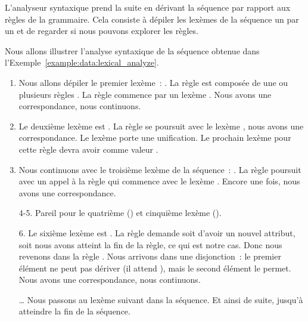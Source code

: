 L'analyseur syntaxique prend la suite en dérivant la séquence par rapport aux
règles de la grammaire. Cela consiste à dépiler les lexèmes de la séquence un
par un et de regarder si nous pouvons explorer les règles.

\begin{example}[Analyse syntaxique de \code{<a x="y"><b /><c>foo</c></a>}]
\label{example:data:syntactic_analyze}

Nous allons illustrer l'analyse syntaxique de la séquence obtenue dans
l'Exem\-ple~\ref{example:data:lexical_analyze}.

\begin{enumerate}

\item Nous allons dépiler le premier lexème~: . La règle  est
composée de une ou plusieurs règles . La règle  commence par
un lexème . Nous avons une correspondance, nous continuons.

\item Le deuxième lexème est . La règle  se poursuit avec
le lexème , nous avons une correspondance. Le lexème 
porte une unification. Le prochain lexème  pour cette règle devra
avoir comme valeur .

\item Nous continuons avec le troisième lexème de la séquence~: . La
règle  poursuit avec un appel à la règle  qui
commence avec le lexème . Encore une fois, nous avons une
correspondance.

\item[4-5.] Pareil pour le quatrième () et cinquième lexème
().

\item[6.] Le sixième lexème est . La règle  demande
soit d'avoir un nouvel attribut, soit nous avons atteint la fin de la règle, ce
qui est notre cas. Donc nous revenons dans la règle . Nous arrivons
dans une disjonction~: le premier élément ne peut pas dériver  (il
attend ), mais le second élément le permet. Nous avons une
correspondance, nous continuons.

\item[…] Nous passons au lexème suivant dans la séquence. Et ainsi de suite,
jusqu'à atteindre la fin de la séquence.

\end{enumerate}

\end{example}

